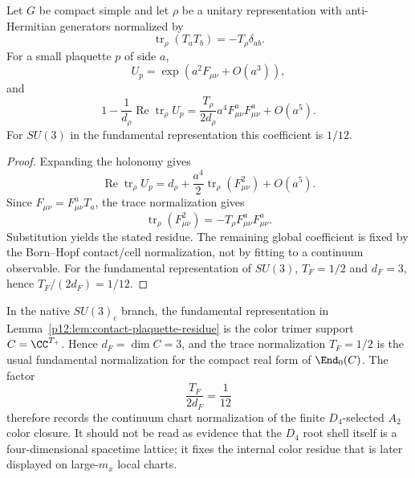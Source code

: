 \documentclass[12pt,a4paper]{article}
\begin{document}
\begin{lemma}
\label{p12:lem:contact-plaquette-residue}
Let \(G\) be compact simple and let \(\rho\) be a unitary representation with anti-Hermitian generators normalized by
\[
\operatorname{tr}_\rho(T_aT_b)=-T_\rho\delta_{ab}.
\]
For a small plaquette \(p\) of side \(a\),
\[
U_p=\exp(a^2F_{\mu\nu}+O(a^3)),
\]
and
\[
1-\frac1{d_\rho}\operatorname{Re}\operatorname{tr}_\rho U_p
=
\frac{T_\rho}{2d_\rho}a^4F_{\mu\nu}^aF_{\mu\nu}^a+O(a^5).
\]
For \(SU(3)\) in the fundamental representation this coefficient is \(1/12\).
\end{lemma}
\begin{proof}
Expanding the holonomy gives
\[
\operatorname{Re}\operatorname{tr}_\rho U_p
=d_\rho+\frac{a^4}{2}\operatorname{tr}_\rho(F_{\mu\nu}^2)+O(a^5).
\]
Since \(F_{\mu\nu}=F_{\mu\nu}^aT_a\), the trace normalization gives
\[
\operatorname{tr}_\rho(F_{\mu\nu}^2)=-T_\rho F_{\mu\nu}^aF_{\mu\nu}^a.
\]
Substitution yields the stated residue.  The remaining global coefficient is fixed by the Born--Hopf contact/cell normalization, not by fitting to a continuum observable.  For the fundamental representation of \(SU(3)\), \(T_F=1/2\) and \(d_F=3\), hence \(T_F/(2d_F)=1/12\).
\end{proof}

\begin{remark}
\label{p12:rem:trimer-origin-plaquette-coefficient}
In the native \(SU(3)_c\) branch, the fundamental representation in
Lemma~\ref{p12:lem:contact-plaquette-residue} is the color trimer support
\(C=\CC^{T_+}\).  Hence \(d_F=\dim C=3\), and the trace normalization
\(T_F=1/2\) is the usual fundamental normalization for the compact real form
of \(\End_0(C)\).  The factor
\[
\frac{T_F}{2d_F}=\frac1{12}
\]
therefore records the continuum chart normalization of the finite
\(D_4\)-selected \(A_2\) color closure.  It should not be read as evidence
that the \(D_4\) root shell itself is a four-dimensional spacetime lattice;
it fixes the internal color residue that is later displayed on large-\(m_x\)
local charts.
\end{remark}
\end{document}
